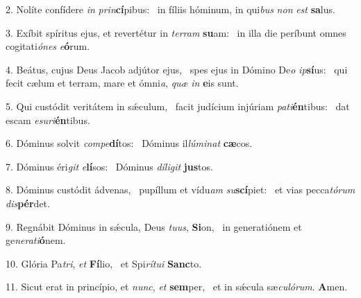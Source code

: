 2. Nolíte confídere \textit{in} \textit{prin}\textbf{cí}pibus: \ast\  in fíliis hóminum, in qui\textit{bus} \textit{non} \textit{est} \textbf{sa}lus.\

3. Exíbit spíritus ejus, et revertétur in \textit{ter}\textit{ram} \textbf{su}am: \ast\  in illa die períbunt omnes cogitati\textit{ó}\textit{nes} \textit{e}\textbf{ó}rum.\

4. Beátus, cujus Deus Jacob adjútor ejus, \dag\  spes ejus in Dómino De\textit{o} \textit{ip}\textbf{sí}us: \ast\  qui fecit cælum et terram, mare et ómni\textit{a}, \textit{quæ} \textit{in} \textbf{e}is sunt.\

5. Qui custódit veritátem in sǽculum, \dag\  facit judícium injúriam \textit{pa}\textit{ti}\textbf{én}tibus: \ast\  dat escam \textit{e}\textit{su}\textit{ri}\textbf{én}tibus.\

6. Dóminus solvit \textit{com}\textit{pe}\textbf{dí}tos: \ast\  Dóminus il\textit{lú}\textit{mi}\textit{nat} \textbf{cæ}cos.\

7. Dóminus éri\textit{git} \textit{e}\textbf{lí}sos: \ast\  Dóminus \textit{dí}\textit{li}\textit{git} \textbf{jus}tos.\

8. Dóminus custódit ádvenas, \dag\  pupíllum et vídu\textit{am} \textit{su}\textbf{scí}piet: \ast\  et vias pecca\textit{tó}\textit{rum} \textit{dis}\textbf{pér}det.\

9. Regnábit Dóminus in sǽcula, Deus \textit{tu}\textit{us}, \textbf{Si}on, \ast\  in generatiónem et ge\textit{ne}\textit{ra}\textit{ti}\textbf{ó}nem.\

10. Glória Pa\textit{tri}, \textit{et} \textbf{Fí}lio, \ast\  et Spi\textit{rí}\textit{tu}\textit{i} \textbf{Sanc}to.\

11. Sicut erat in princípio, et \textit{nunc}, \textit{et} \textbf{sem}per, \ast\  et in sǽcula sæ\textit{cu}\textit{ló}\textit{rum}. \textbf{A}men.\

